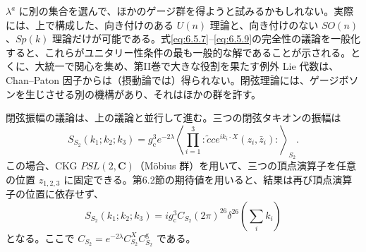 $\lambda^a$ に別の集合を選んで、ほかのゲージ群を得ようと試みるかもしれない。実際には、上で構成した、向き付けのある $U(n)$ 理論と、向き付けのない $SO(n)$、$Sp(k)$ 理論だけが可能である。式\eqref{eq:6.5.7}--\eqref{eq:6.5.9}の完全性の議論を一般化すると、これらがユニタリー性条件の最も一般的な解であることが示される。とくに、大統一で関心を集め、第II巻で大きな役割を果たす例外 Lie 代数は、Chan--Paton 因子からは（摂動論では）得られない。閉弦理論には、ゲージボソンを生じさせる別の機構があり、それはほかの群を許す。

\label{sec:6.6}

閉弦振幅の議論は、上の議論と並行して進む。三つの閉弦タキオンの振幅は
\begin{equation}
S_{S_2}(k_1;k_2;k_3)=g_{\mathrm c}^3e^{-2\lambda}
\left\langle\prod_{i=1}^{3}:\widetilde c c e^{ik_i\cdot X}(z_i,\bar z_i):
\right\rangle_{S_2}.
\tag{6.6.1}\label{eq:6.6.1}
\end{equation}
この場合、CKG $PSL(2,\mathbf C)$（Möbius 群）を用いて、三つの頂点演算子を任意の位置 $z_{1,2,3}$ に固定できる。第6.2節の期待値を用いると、結果は再び頂点演算子の位置に依存せず、
\begin{equation}
S_{S_2}(k_1;k_2;k_3)=ig_{\mathrm c}^3C_{S_2}(2\pi)^{26}
\delta^{26}\left(\sum_i k_i\right)
\tag{6.6.2}\label{eq:6.6.2}
\end{equation}
となる。ここで $C_{S_2}=e^{-2\lambda}C^X_{S_2}C^{\mathrm g}_{S_2}$ である。

